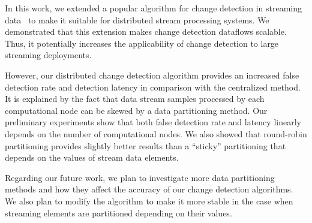 
In this work, we extended a popular algorithm for change detection in streaming data~\cite{kifer2004detecting} to make it suitable for distributed stream processing systems. We demonstrated that this extension makes change detection dataflows scalable. Thus, it potentially increases the applicability of change detection to large streaming deployments.

However, our distributed change detection algorithm provides an increased false detection rate and detection latency in comparison with the centralized method. It is explained by the fact that data stream samples processed by each computational node can be skewed by a data partitioning method. Our preliminary experiments show that both false detection rate and latency linearly depends on the number of computational nodes. We also showed that round-robin partitioning provides slightly better results than a ``sticky'' partitioning that depends on the values of stream data elements.

Regarding our future work, we plan to investigate more data partitioning methods and how they affect the accuracy of our change detection algorithms. We also plan to modify the algorithm to make it more stable in the case when streaming elements are partitioned depending on their values.